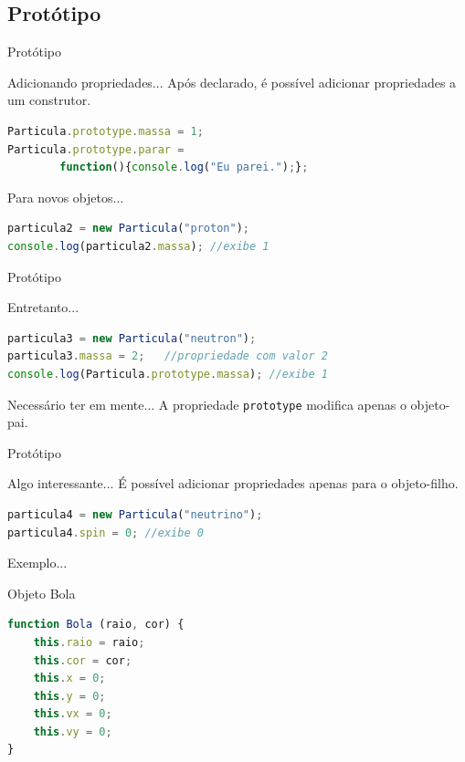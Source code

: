 \documentclass[xcolor=dvipsnames,table]{beamer}
\begin{document}
\subsection{Protótipo}
\begin{frame}[fragile]{Protótipo}
	\begin{block}{Adicionando propriedades...}
		Após declarado, é possível adicionar propriedades a um construtor.
		\begin{lstlisting}[language=JavaScript]
Particula.prototype.massa = 1;
Particula.prototype.parar = 
		function(){console.log("Eu parei.");};
\end{lstlisting}	
	\end{block} \pause
	\begin{block}{Para novos objetos...}
		\begin{lstlisting}[language=JavaScript]
particula2 = new Particula("proton");
console.log(particula2.massa); //exibe 1
\end{lstlisting}	
	\end{block}
\end{frame}

\begin{frame}[fragile]{Protótipo}
	\begin{block}{Entretanto...}
		\begin{lstlisting}[language=JavaScript]
particula3 = new Particula("neutron");
particula3.massa = 2;	//propriedade com valor 2
console.log(Particula.prototype.massa);	//exibe 1
\end{lstlisting}	
	\end{block} \pause
	\begin{alertblock}{Necessário ter em mente...}
		A propriedade {\tt prototype} modifica apenas o objeto-pai.	
	\end{alertblock}
\end{frame}

\begin{frame}[fragile]{Protótipo}
	\begin{block}{Algo interessante...}
		É possível adicionar propriedades apenas para o objeto-filho.
		\begin{lstlisting}[language=JavaScript]
particula4 = new Particula("neutrino");
particula4.spin = 0; //exibe 0
\end{lstlisting}	
	\end{block}
\end{frame}

\begin{frame}[fragile]{Exemplo...}
	\begin{block}{Objeto Bola}
		\begin{lstlisting}[language=JavaScript]
function Bola (raio, cor) {
	this.raio = raio;
	this.cor = cor;
	this.x = 0;
	this.y = 0;
	this.vx = 0;
	this.vy = 0;
}
\end{lstlisting}	
	\end{block}
\end{frame}
\end{document}

